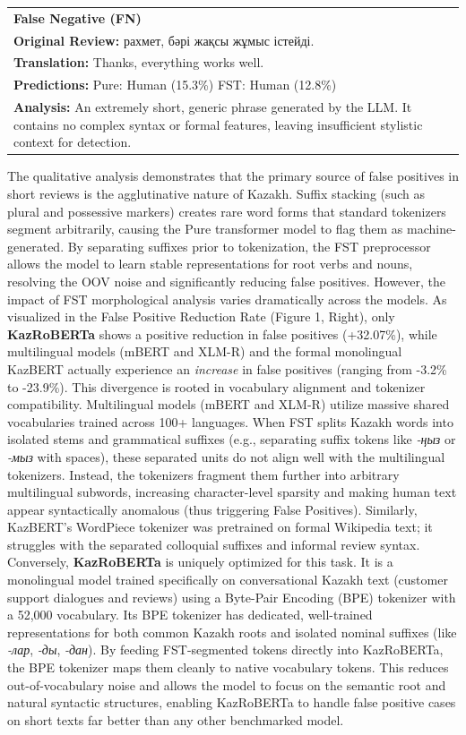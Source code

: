 \documentclass[runningheads]{llncs}
\begin{document}
\begin{table}
\begin{tabular}{p{11.8cm}}
\midrule
\textbf{False Negative (FN)} \\
\smallskip
\textbf{Original Review:} рахмет, бәрі жақсы жұмыс істейді. \\
\textbf{Translation:} Thanks, everything works well. \\
\textbf{Predictions:} Pure: Human (15.3\%) \hfill FST: Human (12.8\%) \\
\textbf{Analysis:} An extremely short, generic phrase generated by the LLM. It contains no complex syntax or formal features, leaving insufficient stylistic context for detection. \\
\bottomrule
\end{tabular}
\end{table}

The qualitative analysis demonstrates that the primary source of false positives in short reviews is the agglutinative nature of Kazakh. Suffix stacking (such as plural and possessive markers) creates rare word forms that standard tokenizers segment arbitrarily, causing the Pure transformer model to flag them as machine-generated. By separating suffixes prior to tokenization, the FST preprocessor allows the model to learn stable representations for root verbs and nouns, resolving the OOV noise and significantly reducing false positives.
However, the impact of FST morphological analysis varies dramatically across the models. As visualized in the False Positive Reduction Rate (Figure 1, Right), only \textbf{KazRoBERTa} shows a positive reduction in false positives (+32.07\%), while multilingual models (mBERT and XLM-R) and the formal monolingual KazBERT actually experience an \textit{increase} in false positives (ranging from -3.2\% to -23.9\%). 
This divergence is rooted in vocabulary alignment and tokenizer compatibility. Multilingual models (mBERT and XLM-R) utilize massive shared vocabularies trained across 100+ languages. When FST splits Kazakh words into isolated stems and grammatical suffixes (e.g., separating suffix tokens like \textit{-ңыз} or \textit{-мыз} with spaces), these separated units do not align well with the multilingual tokenizers. Instead, the tokenizers fragment them further into arbitrary multilingual subwords, increasing character-level sparsity and making human text appear syntactically anomalous (thus triggering False Positives). Similarly, KazBERT's WordPiece tokenizer was pretrained on formal Wikipedia text; it struggles with the separated colloquial suffixes and informal review syntax. 
Conversely, \textbf{KazRoBERTa} is uniquely optimized for this task. It is a monolingual model trained specifically on conversational Kazakh text (customer support dialogues and reviews) using a Byte-Pair Encoding (BPE) tokenizer with a 52,000 vocabulary. Its BPE tokenizer has dedicated, well-trained representations for both common Kazakh roots and isolated nominal suffixes (like \textit{-лар}, \textit{-ды}, \textit{-дан}). By feeding FST-segmented tokens directly into KazRoBERTa, the BPE tokenizer maps them cleanly to native vocabulary tokens. This reduces out-of-vocabulary noise and allows the model to focus on the semantic root and natural syntactic structures, enabling KazRoBERTa to handle false positive cases on short texts far better than any other benchmarked model.
\end{document}
